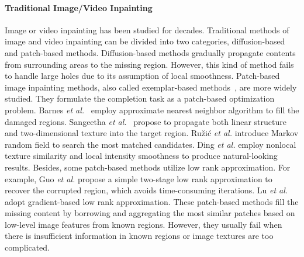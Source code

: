 \paragraph{Traditional Image/Video Inpainting} Image or video inpainting has been studied for decades. 
%
Traditional methods of image and video inpainting can be divided into two categories, diffusion-based and patch-based methods. 
Diffusion-based methods \cite{bertalmio2000image,ballester2001filling,sridevi2019image} gradually propagate contents from surrounding areas to the missing region. 
%
However, this kind of method fails to handle large holes due to its assumption of local smoothness. 
%
Patch-based image inpainting methods, also called exemplar-based methods~\cite{bertalmio2003simultaneous,efros2001image}, are more widely studied.
They formulate the completion task as a patch-based optimization problem. 
Barnes \emph{et al.}~\cite{barnes2009patchmatch} employ approximate nearest neighbor algorithm to fill the damaged regions.
Sangeetha \emph{et al.}~\cite{sangeetha2011combined} propose to propagate both linear structure and two-dimensional texture into the target region.
Ru{\v{z}}i{\'c} \emph{et al.} \cite{ruvzic2014context} introduce Markov random field to search the most matched candidates.
Ding \emph{et al.} \cite{ding_19nonlocal} employ nonlocal texture similarity and local intensity smoothness to produce natural-looking results.
Besides, some patch-based methods utilize low rank approximation. For example, Guo \emph{et al.} \cite{pb_lowrank2018} propose a simple two-stage low rank approximation to recover the corrupted region, which avoids time-consuming iterations.
Lu \emph{et al.} \cite{lu2018gradient} adopt gradient-based low rank approximation.
These patch-based methods fill the missing content by borrowing and aggregating the most similar patches based on low-level image features from known regions. However, they usually fail when there is insufficient information in known regions or image textures are too complicated.  
%

